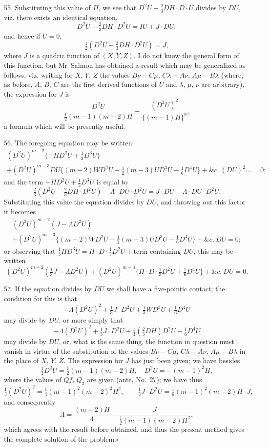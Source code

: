 \documentclass[11pt,a4paper]{article}
\theoremstyle{definition}
\begin{document}
55. Substituting this value of $\Pi$, we see that $D^2U-\tfrac{2}{3}DH\cdot D\cdot U$ divides by $DU$, viz. there exists an identical equation,
\[
D^2U-\tfrac{2}{3}DH\cdot D^2U=IU+J\cdot DU;
\]
and hence if $U=0$,
\[
\tfrac{1}{2}(D^2U-\tfrac{2}{3}DH\cdot D^2U)=J,
\]
where $J$ is a quadric function of $(X,Y,Z)$. I do not know the general form of this function, but Mr~Salmon has obtained a result which may be generalized as follows, viz. writing for $X$, $Y$, $Z$ the values $B\nu-C\mu$, $C\lambda-A\nu$, $A\mu-B\lambda$ (where, as before, $A$, $B$, $C$ are the first derived functions of $U$ and $\lambda$, $\mu$, $\nu$ are arbitrary), the expression for $J$ is
\[
\frac{D^2U}{\tfrac{1}{2}(m-1)(m-2)H}-\frac{(D^2U)^2}{\{(m-1)H\}^2},
\]
a formula which will be presently useful.

56. The foregoing equation may be written
\begin{multline*}
(D^2U)^{m-2}\{-\Pi D^2U+\tfrac{1}{3}D^3U\}\\
+(D^2U)^{m-3}DU\{(m-2)W D^2U-\tfrac{1}{2}(m-3)UD^3U-\tfrac{1}{6}D^4U\}+\&c.\ (DU)^2\ldots=0;
\end{multline*}
and the term $-\Pi D^2U+\tfrac{1}{3}D^3U$ is equal to
\[
\tfrac{2}{3}(D^2U-\tfrac{2}{3}DH\cdot D^2U)-\Lambda\cdot DU\cdot D^2U=J\cdot DU-\Lambda\cdot DU\cdot D^2U.
\]
Substituting this value the equation divides by $DU$, and throwing out this factor it becomes
\begin{multline*}
(D^2U)^{m-2}(J-\Lambda D^2U)\\
+(D^2U)^{m-3}\{(m-2)W D^2U-\tfrac{1}{2}(m-3)UD^3U-\tfrac{1}{6}D^4U\}+\&c.\ DU=0;
\end{multline*}
or observing that $\tfrac{1}{3}\Pi D^3U=\Pi\cdot D\cdot\tfrac{1}{3}D^2U+\text{term containing }DU$, this may be written
\[
(D^2U)^{m-2}(\tfrac{1}{3}J-\Lambda D^2U)+(D^2U)^{m-3}\{\Pi\cdot D\cdot\tfrac{1}{3}D^2U+\tfrac{1}{6}D^4U\}+\&c.\ DU=0.
\]

57. If the equation divides by $DU$ we shall have a five-pointic contact; the condition for this is that
\[
-\Lambda(D^2U)^2+\tfrac{1}{3}J\cdot D^2U+\tfrac{1}{3}W D^3U+\tfrac{1}{6}D^4U
\]
may divide by $DU$, or more simply that
\[
-\Lambda(D^2U)^2+\tfrac{1}{3}J\cdot D^2U+\tfrac{1}{3}(\tfrac{2}{3}DH)D^2U-\tfrac{1}{6}D^4U
\]
may divide by $DU$, or, what is the same thing, the function in question must vanish in virtue of the substitution of the values $B\nu-C\mu$, $C\lambda-A\nu$, $A\mu-B\lambda$ in the place of $X$, $Y$, $Z$. The expression for $J$ has just been given; we have besides
\[
\tfrac{1}{3}D^2U=\tfrac{1}{2}(m-1)(m-2)H,\quad D^2U=-(m-1)^2H,
\]
where the values of $Q\!f$, $Q_2$ are given (ante, No.~27); we have thus
\[
\tfrac{1}{3}(D^2U)^2=\tfrac{1}{4}(m-1)^2(m-2)^2H^2,\qquad \tfrac{1}{3}J\cdot D^2U=\tfrac{1}{6}(m-1)^2(m-2)H\cdot J,
\]
and consequently
\[
\Lambda=\frac{(m-2)H}{4}-\frac{J}{\tfrac{1}{2}(m-1)(m-2)H^2},
\]
which agrees with the result before obtained, and thus the present method gives the complete solution of the problem.\hfill$\square$
\end{document}

